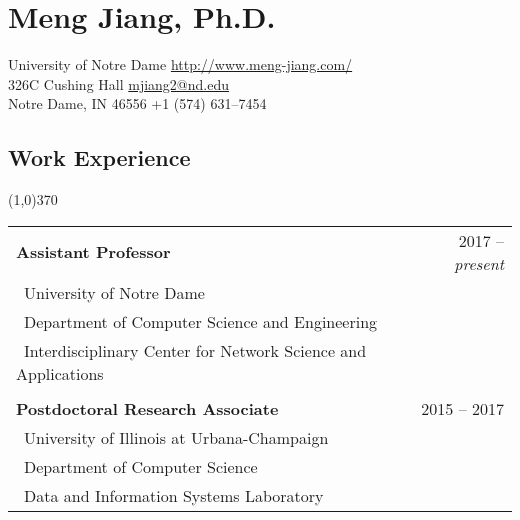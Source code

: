 \documentclass[10pt]{article}
\begin{document}
\setcounter{secnumdepth}{0}

\thispagestyle{firststyle}

\section{\LARGE{\sc Meng Jiang, Ph.D.}}
University of Notre Dame \hfill \url{http://www.meng-jiang.com/} \\
326C Cushing Hall \hfill \url{mjiang2@nd.edu}\\
Notre Dame, IN 46556 \hfill +1 (574) 631--7454



\subsection{\sc Work Experience}
\vspace{-0.4cm} \line(1,0){370} \vspace{0.1cm}

\begin{table}[h!]
\begin{tabular*}{12.7cm}{p{6.5cm}p{1.25cm}r}
\bf{Assistant Professor}&~&~~2017 -- \emph{present}\\
 \multicolumn{2}{l}{~{University of Notre Dame}}\\
 \multicolumn{2}{l}{~{Department of Computer Science and Engineering}}\\
 \multicolumn{2}{l}{~{Interdisciplinary Center for Network Science and Applications}}\\
\\
\bf{Postdoctoral Research Associate}&~&~~2015 -- 2017\\
 \multicolumn{2}{l}{~{University of Illinois at Urbana-Champaign}}\\
 \multicolumn{2}{l}{~{Department of Computer Science}}\\
 \multicolumn{2}{l}{~{Data and Information Systems Laboratory}}
\end{tabular*}
\end{table}
\vspace{-0.4cm}
\end{document}
